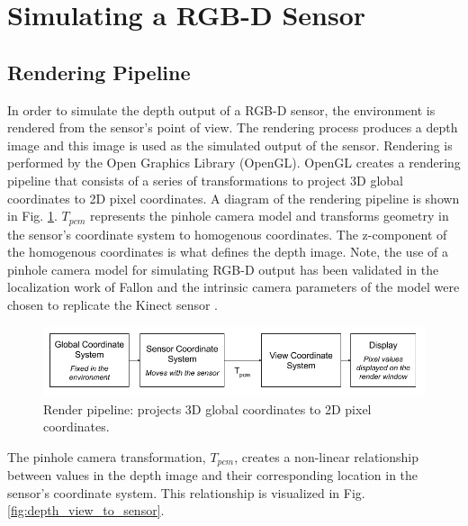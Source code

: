 \section{Simulating a RGB-D Sensor}

\subsection{Rendering Pipeline}

In order to simulate the depth output of a RGB-D sensor, the environment is
rendered from the sensor's point of view. The rendering process produces a depth
image and this image is used as the simulated output of the sensor. Rendering is
performed by the Open Graphics Library (OpenGL). OpenGL creates a rendering
pipeline that consists of a series of transformations to project 3D global
coordinates to 2D pixel coordinates. A diagram of the rendering pipeline is
shown in Fig. \ref{fig:render_pipeline}. $T_{pcm}$ represents the pinhole
camera model and transforms geometry in the sensor's coordinate system to
homogenous coordinates. The z-component of the homogenous coordinates is what
defines the depth image. Note, the use of a pinhole camera model for simulating
RGB-D output has been validated in the localization work of Fallon
\cite{Fallon2012} and the intrinsic camera parameters of the model were chosen
to replicate the Kinect sensor \cite{sitekinectspecs}.

\begin{figure}[h]%
\centering
  \includegraphics[width=\textwidth]{figures/diagram_render_pipeline.png}
  \caption{Render pipeline: projects 3D global coordinates to 2D pixel coordinates. }
  \label{fig:render_pipeline}
\end{figure}

The pinhole camera transformation, $T_{pcm}$, creates a non-linear relationship between
values in the depth image and their corresponding location in the sensor's
coordinate system. This relationship is visualized in Fig.
\ref{fig:depth_view_to_sensor}.

